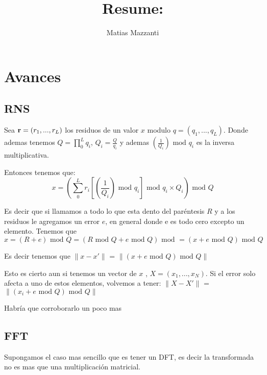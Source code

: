 \documentclass[12pt, oneside]{article}
\title{Resume: }
\author{Matias Mazzanti}
\date{}
\begin{document}
\maketitle
\tableofcontents

\section{Avances}

\subsection{RNS}

Sea $\bold{r} = (r_1, ..., r_L)$ los residuos de un valor $x$ modulo $q = (q_1, ...,q_L)$.
Donde ademas tenemos $Q = \prod_0^L q_i$, $Q_i = \frac{Q}{q_i}$ y ademas $\left(\frac{1}{Q_{i}}\right)\text{ mod } q_i$ es la inversa multiplicativa.

Entonces tenemos que:
\begin{equation}
    x = \left(\sum_0^L r_i\left[\left(\frac{1}{Q_{i}}\right)\text{ mod } q_i\right]\text{ mod } q_i \times Q_i\right) \text{ mod } Q
\end{equation}

Es decir que si llamamos a todo lo que esta dento del paréntesis $R$ y a los residuos le agregamos un error $e$, en general donde e es todo cero excepto un elemento.
Tenemos que
\begin{equation}
    x = \left(R + e \right) \text{ mod } Q = \left(R \text{ mod } Q + e \text{ mod } Q \right) \text{ mod } = \left( x + e \text{ mod } Q \right) \text{ mod } Q
\end{equation}

Es decir tenemos que
$\lVert x - x' \rVert$ = $\lVert (x + e \text{ mod } Q ) \text{ mod }Q \rVert$

Esto es cierto aun si tenemos un vector de $x$ , $X = (x_1, ...,x_N)$.
Si el error solo afecta a uno de estos elementos, volvemos a tener:
$\lVert X - X' \rVert$ = $\lVert (x_i + e \text{ mod } Q ) \text{ mod }Q \rVert$

Habría que corroborarlo un poco mas


\subsection{FFT}

Supongamos el caso mas sencillo que es tener un DFT, es decir la transformada no es mas que una
multiplicación matricial.
\end{document}
